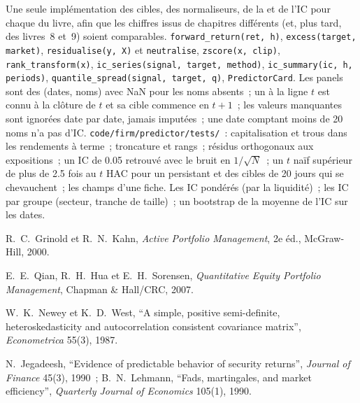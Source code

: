 \begin{build}
 Une seule implémentation des cibles, des normaliseurs, de la  et de l'IC pour chaque  du livre, afin que
les chiffres issus de chapitres différents (et, plus tard, des livres~8 et~9) soient comparables.
 \texttt{forward\_return(ret, h)}, \texttt{excess(target, market)}, \texttt{residualise(y, X)} et
\texttt{neutralise}, \texttt{zscore(x, clip)}, \texttt{rank\_transform(x)}, \texttt{ic\_series(signal, target, method)},
\texttt{ic\_summary(ic, h, periods)}, \texttt{quantile\_spread(signal, target, q)}, \texttt{PredictorCard}.
 Les panels sont des (dates, noms) avec NaN pour les noms absents~; un  à la ligne $t$ est connu à la clôture de $t$ et sa cible
commence en $t+1$~; les valeurs manquantes sont ignorées date par date, jamais imputées~; une date comptant moins de 20 noms n'a pas d'IC.
 \texttt{code/firm/predictor/tests/}~: capitalisation et trous dans les rendements à terme~; troncature et rangs~;
résidus orthogonaux aux expositions~; un IC de 0.05 retrouvé avec le bruit en $1/\sqrt N$~; un $t$ naïf supérieur de plus de 2.5 fois au $t$ HAC
pour un  persistant et des cibles de 20 jours qui se chevauchent~; les champs d'une fiche.
 Les IC pondérés (par la liquidité)~; les IC par groupe (secteur, tranche de taille)~; un bootstrap de la moyenne de l'IC sur les dates.
\end{build}

\begin{omsources}
\item R.~C.~Grinold et R.~N.~Kahn, \emph{Active Portfolio Management}, 2e éd., McGraw-Hill, 2000.
\item E.~E.~Qian, R.~H.~Hua et E.~H.~Sorensen, \emph{Quantitative Equity Portfolio Management}, Chapman \& Hall/CRC, 2007.
\item W.~K.~Newey et K.~D.~West, ``A simple, positive semi-definite, heteroskedasticity and autocorrelation consistent covariance
matrix'', \emph{Econometrica} 55(3), 1987.
\item N.~Jegadeesh, ``Evidence of predictable behavior of security returns'', \emph{Journal of Finance} 45(3), 1990~; B.~N.~Lehmann,
``Fads, martingales, and market efficiency'', \emph{Quarterly Journal of Economics} 105(1), 1990.
\end{omsources}

